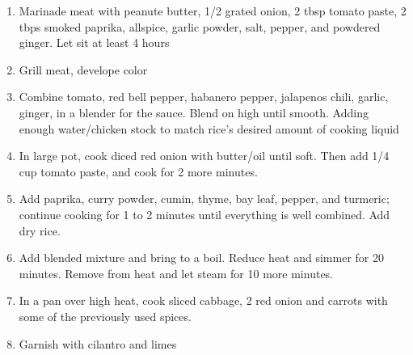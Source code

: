 \documentclass[]{report}
\newcommand{\meal}[5]{
\chapter{\uppercase{#1}\index{\uppercase{#1}}}  %
\vspace{0.5cm}
\textit{#2}\vspace{0.5cm} \\                      %
{\textbf{Serves: #3}}                %
\vspace{0.1cm}\\
\begin{adjustwidth}{-1.7em}{1.5em}
\begin{minipage}[t]{0.42\textwidth}
      #4                            %
\end{minipage}
\begin{minipage}[t]{0.62\textwidth}
      \vspace{-0.7cm}
      \textbf{#5}                            %
\end{minipage}
\end{adjustwidth}
}
\begin{document}
            {\begin{enumerate}    %
                  \item  Marinade meat with peanute butter, 1/2 grated onion, 2 tbsp tomato paste, 2 tbps smoked paprika, allspice, garlic powder, salt, pepper, and powdered ginger. Let sit at least 4 hours 
                  \item Grill meat, develope color 
                  \item Combine tomato, red bell pepper, habanero pepper, jalapenos chili, garlic, ginger, in a blender for the sauce. Blend on high until smooth. Adding enough water/chicken stock to match rice's desired amount of cooking liquid 
                  \item In large pot, cook diced red onion with butter/oil until soft. Then add 1/4 cup tomato paste, and cook for 2 more minutes.
                  \item Add  paprika, curry powder, cumin, thyme, bay leaf, pepper, and turmeric; continue cooking for 1 to 2 minutes until everything is well combined. Add dry rice.
                  \item Add blended mixture and bring to a boil. Reduce heat and simmer for 20 minutes. Remove from heat and let steam for 10 more minutes. 
                  \item In a pan over high heat, cook sliced cabbage, 2 red onion and carrots with some of the previously used spices.
                  \item Garnish with cilantro and limes 
            \end{enumerate}}
            
            \printindex
\end{document}
